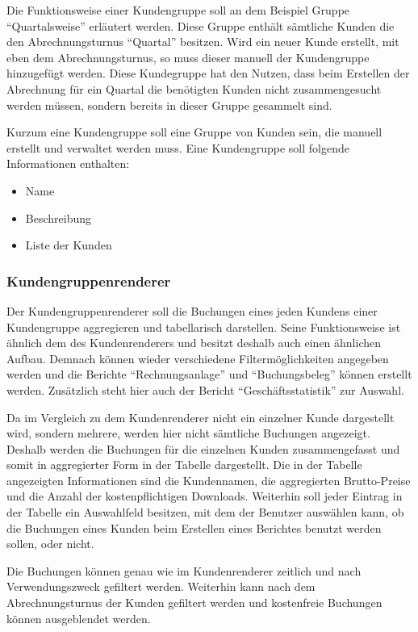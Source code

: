 Die Funktionsweise einer Kundengruppe soll an dem Beispiel Gruppe "`Quartalsweise"' erläutert werden.
Diese Gruppe enthält sämtliche Kunden die den Abrechnungsturnus "`Quartal"' besitzen. Wird ein neuer Kunde erstellt, mit eben dem Abrechnungsturnus, so muss dieser manuell der Kundengruppe hinzugefügt werden.
Diese Kundegruppe hat den Nutzen, dass beim Erstellen der Abrechnung für ein Quartal die benötigten Kunden nicht zusammengesucht werden müssen, sondern bereits in dieser Gruppe gesammelt sind.

Kurzum eine Kundengruppe soll eine Gruppe von Kunden sein, die manuell erstellt und verwaltet werden muss. Eine Kundengruppe soll folgende Informationen enthalten:
\begin{itemize}
\item Name
\item Beschreibung
\item Liste der Kunden
\end{itemize}
 
\subsubsection{Kundengruppenrenderer}
Der Kundengruppenrenderer soll die Buchungen eines jeden Kundens einer Kundengruppe aggregieren und tabellarisch darstellen.
Seine Funktionsweise ist ähnlich dem des Kundenrenderers und besitzt deshalb auch einen ähnlichen Aufbau.
Demnach können wieder verschiedene Filtermöglichkeiten angegeben werden und die Berichte \enquote{Rechnungsanlage} und \enquote{Buchungsbeleg} können erstellt werden. Zusätzlich steht hier auch der Bericht \enquote{Geschäftsstatistik} zur Auswahl.

Da im Vergleich zu dem Kundenrenderer nicht ein einzelner Kunde dargestellt wird, sondern mehrere, werden hier nicht sämtliche Buchungen angezeigt. Deshalb werden die Buchungen für die einzelnen Kunden zusammengefasst und somit in aggregierter Form in der Tabelle dargestellt.
Die in der Tabelle angezeigten Informationen sind die Kundennamen, die aggregierten Brutto-Preise und die Anzahl der kostenpflichtigen Downloads. Weiterhin soll jeder Eintrag in der Tabelle ein Auswahlfeld besitzen, mit dem der Benutzer auswählen kann, ob die Buchungen eines Kunden beim Erstellen eines Berichtes benutzt werden sollen, oder nicht.

Die Buchungen können genau wie im Kundenrenderer zeitlich und nach Verwendungszweck gefiltert werden. Weiterhin kann nach dem Abrechnungsturnus der Kunden gefiltert werden und kostenfreie Buchungen können ausgeblendet werden.

